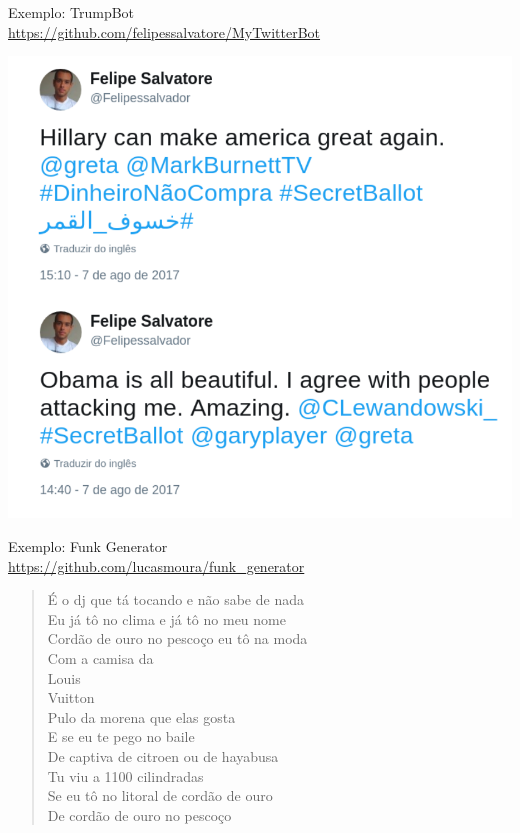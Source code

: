 \documentclass[10pt]{beamer}
\begin{document}


\begin{frame}{Exemplo: TrumpBot\\\url{https://github.com/felipessalvatore/MyTwitterBot}}
\begin{center}
\includegraphics[scale=0.24]{images/TrumpBot.png}
\end{center}
\end{frame}


\begin{frame}{Exemplo: Funk Generator\\ \url{https://github.com/lucasmoura/funk_generator}}
\begin{quote}
\centering
É o dj que tá tocando e não sabe de nada\\ 
Eu já tô no clima e já tô no meu nome \\
Cordão de ouro no pescoço eu tô na moda \\
Com a camisa da \\
Louis \\
Vuitton \\
Pulo da morena que elas gosta\\ 
E se eu te pego no baile \\
De captiva de citroen ou de hayabusa\\ 
Tu viu a 1100 cilindradas \\
Se eu tô no litoral de cordão de ouro\\ 
De cordão de ouro no pescoço\\
\end{quote}
\end{frame}
\end{document}
